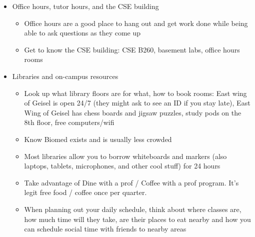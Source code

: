 \begin{itemize}
\begin{itemize}
\item Don't be afraid to talk to the people next to you during group discussions. Odds are they're as nervous as you are, and you can all benefit from sharing your thoughts and understanding of the material 
\item Certain classes will podcast the lectures, just like Zoom archives lecture recordings, at podcast.ucsd.edu . If they aren't podcasted, and you want to record lectures, ask your professor for consent first
\end{itemize}
\item Office hours, tutor hours, and the CSE building
\begin{itemize}
\item Office hours are a good place to hang out and get work done while being able to ask questions as they come up 
\item Get to know the CSE building: CSE B260, basement labs, office hours rooms
\end{itemize}
\item Libraries and on-campus resources
\begin{itemize}
\item Look up what library floors are for what, how to book rooms: East wing of Geisel is open 24/7 (they might ask to see an ID if you stay late), East Wing of Geisel has chess boards and jigsaw puzzles, study pods on the 8th floor, 
free computers/wifi
\item Know Biomed exists and is usually less crowded
\item Most libraries allow you to borrow whiteboards and markers (also laptops, tablets, microphones, and other cool stuff) for 24 hours
\item Take advantage of Dine with a prof / Coffee with a prof program. It's legit free food / coffee once per quarter. 
\item When planning out your daily schedule, think about where classes are, how much time will they take, are their places to eat nearby and how you can schedule social time with friends to nearby areas 

\end{itemize}
\end{itemize}
